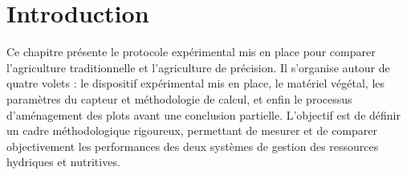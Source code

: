 \section{Introduction}
Ce chapitre présente le protocole expérimental mis en place pour comparer l'agriculture traditionnelle et l'agriculture de précision. Il s'organise autour de quatre volets : le dispositif expérimental mis en place, le matériel végétal, les paramètres du capteur et méthodologie de calcul, et enfin le processus d'aménagement des plots avant une conclusion partielle. 
L'objectif est de définir un cadre méthodologique rigoureux, permettant de mesurer et de comparer objectivement les performances des deux systèmes de gestion des ressources hydriques et nutritives.
